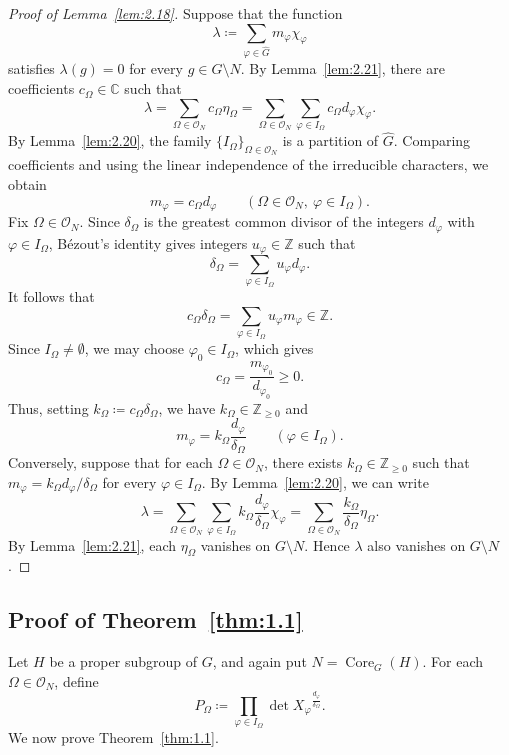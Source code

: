 \documentclass[12pt,a4paper]{article}
\theoremstyle{definition}
\numberwithin{definition}{section}
\DeclareMathOperator{\Core}{Core}
\begin{document}
\begin{proof}[Proof of Lemma~\ref{lem:2.18}]
Suppose that the function
\[
\lambda \coloneqq
\sum_{\varphi\in\widehat G}m_\varphi\chi_\varphi
\]
satisfies $\lambda(g) = 0$ for every $g\in G\setminus N$.
By Lemma~\ref{lem:2.21}, there are coefficients $c_\Omega\in\mathbb{C}$ such that
\[
\lambda
=\sum_{\Omega\in\mathcal{O}_N}c_\Omega\eta_\Omega
=\sum_{\Omega\in\mathcal{O}_N}
 \sum_{\varphi\in I_\Omega}c_\Omega d_\varphi\chi_\varphi.
\]
By Lemma~\ref{lem:2.20}, the family $\{I_\Omega\}_{\Omega\in\mathcal{O}_N}$ is a partition of $\widehat G$.
Comparing coefficients and using the linear independence of the irreducible characters, we obtain
\[
m_\varphi=c_\Omega d_\varphi
\qquad
(\Omega\in\mathcal{O}_N,\ \varphi\in I_\Omega).
\]
Fix $\Omega \in \mathcal{O}_N$.
Since $\delta_\Omega$ is the greatest common divisor of the integers $d_\varphi$ with $\varphi \in I_\Omega$,
B\'ezout's identity gives integers $u_\varphi\in\mathbb{Z}$ such that
\[
\delta_\Omega=\sum_{\varphi\in I_\Omega}u_\varphi d_\varphi.
\]
It follows that
\[
c_\Omega\delta_\Omega
=\sum_{\varphi\in I_\Omega}u_\varphi m_\varphi\in\mathbb{Z}.
\]
Since $I_\Omega \neq \emptyset$, we may choose $\varphi_0\in I_\Omega$, which gives
\[
c_\Omega=\frac{m_{\varphi_0}}{d_{\varphi_0}}\geq0.
\]
Thus, setting $k_\Omega\coloneqq c_\Omega\delta_\Omega$, we have
$k_\Omega\in\mathbb{Z}_{\geq 0}$ and
\[
m_\varphi=k_\Omega\frac{d_\varphi}{\delta_\Omega}
\qquad(\varphi\in I_\Omega).
\]
Conversely, suppose that for each $\Omega\in\mathcal{O}_N$, there exists
$k_\Omega\in\mathbb{Z}_{\geq0}$ such that
$m_\varphi=k_\Omega d_\varphi/\delta_\Omega$ for every $\varphi\in I_\Omega$.
By Lemma~\ref{lem:2.20}, we can write
\[
\lambda
=\sum_{\Omega\in\mathcal{O}_N}
 \sum_{\varphi\in I_\Omega}
 k_\Omega\frac{d_\varphi}{\delta_\Omega}\chi_\varphi
=\sum_{\Omega\in\mathcal{O}_N}
 \frac{k_\Omega}{\delta_\Omega}\eta_\Omega.
\]
By Lemma~\ref{lem:2.21}, each $\eta_\Omega$ vanishes on $G\setminus N$.
Hence $\lambda$ also vanishes on $G\setminus N$.
\end{proof}

\subsection{Proof of Theorem~\ref{thm:1.1}}\label{sec:2.7}
Let $H$ be a proper subgroup of $G$, and again put $N=\Core_G(H)$.
For each $\Omega \in \mathcal{O}_{N}$, define
\[
P_{\Omega} \coloneqq \prod_{\varphi \in I_{\Omega}} \det{X_{\varphi}}^{\frac{d_{\varphi}}{\delta_{\Omega}}}.
\]
We now prove Theorem~\ref{thm:1.1}.
\end{document}
